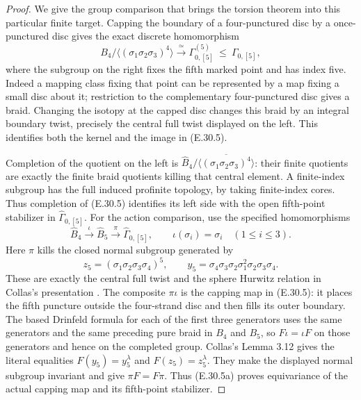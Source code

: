 \begin{proof}
We give the group comparison that brings the torsion theorem
into this particular finite target.  Capping the boundary of
a four-punctured disc by a once-punctured disc gives the exact
discrete homomorphism
\[
 B_4/\langle(\sigma_1\sigma_2\sigma_3)^4\rangle
       \xrightarrow{\ \simeq\ }
 \Gamma_{0,[5]}^{(5)}\ \leq\ \Gamma_{0,[5]},
 \tag{E.30.5}
\]
where the subgroup on the right fixes the fifth marked point
and has index five.  Indeed a mapping class fixing that point
can be represented by a map fixing a small disc about it;
restriction to the complementary four-punctured disc gives a
braid.  Changing the isotopy at the capped disc changes this
braid by an integral boundary twist, precisely the central
full twist displayed on the left.  This identifies both the
kernel and the image in \textup{(E.30.5)}.

Completion of the quotient on the left is
$\widehat B_4/\overline{\langle(\sigma_1\sigma_2\sigma_3)^4\rangle}$:
their finite quotients are exactly the finite braid quotients
killing that central element.  A finite-index subgroup has
the full induced profinite topology, by taking finite-index
cores.  Thus completion of \textup{(E.30.5)} identifies its
left side with the open fifth-point stabilizer in
$\widehat\Gamma_{0,[5]}$.
For the action comparison, use the specified homomorphisms
\[
 \widehat B_4\xrightarrow{\ \iota\ }\widehat B_5
       \xrightarrow{\ \pi\ }\widehat\Gamma_{0,[5]},
 \qquad \iota(\sigma_i)=\sigma_i\quad(1\leq i\leq3).
 \tag{E.30.5a}
\]
Here $\pi$ kills the closed normal subgroup generated by
\[
 z_5=(\sigma_1\sigma_2\sigma_3\sigma_4)^5,
 \qquad y_5=\sigma_4\sigma_3\sigma_2\sigma_1^2
                         \sigma_2\sigma_3\sigma_4.
 \tag{E.30.5b}
\]
These are exactly the central full twist and the sphere
Hurwitz relation in Collas's presentation
\cite[Section 3.1 and Lemma 3.12]{ERootCollas2012}.
The composite $\pi\iota$ is the capping map in
\textup{(E.30.5)}: it places the fifth puncture outside the
four-strand disc and then fills its outer boundary.
The based Drinfeld formula for each of the first three
generators uses the same generators and the same preceding
pure braid in $B_4$ and $B_5$, so $F\iota=\iota F$ on
those generators and hence on the completed group.
Collas's Lemma 3.12 gives the literal equalities
$F(y_5)=y_5^\lambda$ and $F(z_5)=z_5^\lambda$.
They make the displayed normal subgroup invariant and give
$\pi F=F\pi$.  Thus \textup{(E.30.5a)} proves equivariance
of the actual capping map and its fifth-point stabilizer.


\end{proof}
